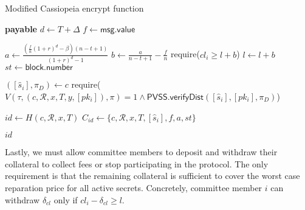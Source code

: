 \begin{algorithm}[h]
\caption{Modified Cassiopeia \textsf{encrypt} function}
\label{alg:encrypt_incentives}
    \begin{algorithmic}[1]
             \textbf{payable}
                \State $d \gets T + \Delta$
                \State $f \gets \textsf{msg.value}$

                \State $a \gets \frac{(\frac{f}{n}(1 + r)^d - \beta)(n - t + 1)}{(1 + r)^d - 1}$ 
                \State $b \gets \frac{a}{n - t + 1} - \frac{f}{n}$ 
                    \State require($cl_i \geq l + b$)
                \EndFor
                \State $l \gets l + b$
                \State $st \gets \textsf{block.number}$

                \State $([\hat{s}_i], \pi_D) \gets c$
                \State require($V(\tau, (c, \mathcal{R}, x, T, y, [pk_i]), \pi) = 1 \land \textsf{PVSS.verifyDist}([\hat{s}_i], [pk_i], \pi_D)$)

                \State $id \gets H(c, \mathcal{R}, x, T)$
                \State $C_{id} \gets \{c, \mathcal{R}, x, T, [\hat{s}_i], f, a, st\}$

                \State \Return $id$
            \EndFunction
    \end{algorithmic}
\end{algorithm}

Lastly, we must allow committee members to deposit and withdraw their collateral to collect fees or stop participating in the protocol.
The only requirement is that the remaining collateral is sufficient to cover the worst case reparation price for all active secrets.
Concretely, committee member $i$ can withdraw $\delta_{cl}$ only if $cl_i - \delta_{cl} \geq l$.